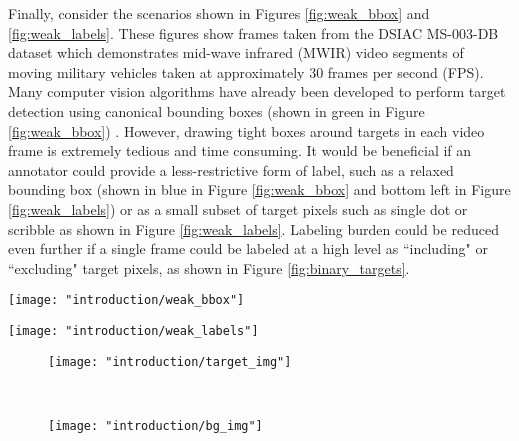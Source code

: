 Finally, consider the scenarios shown in Figures \ref{fig:weak_bbox} and \ref{fig:weak_labels}.  These figures show frames taken from the DSIAC MS-003-DB dataset \citep{DSIACATR} which demonstrates mid-wave infrared (MWIR) video segments of moving military vehicles taken at approximately 30 frames per second (FPS).  Many computer vision algorithms have already been developed to perform target detection using canonical bounding boxes (shown in green in Figure \ref{fig:weak_bbox}) \citep{Redmon2018YOLOV3}.  However, drawing tight boxes around targets in each video frame is extremely tedious and time consuming.  It would be beneficial if an annotator could provide a less-restrictive form of label, such as a relaxed bounding box (shown in blue in Figure \ref{fig:weak_bbox} and bottom left in Figure \ref{fig:weak_labels}) or as a small subset of target pixels such as single dot or scribble as shown in Figure \ref{fig:weak_labels}.  Labeling burden could be reduced even further if a single frame could be labeled at a high level as ``including" or ``excluding" target pixels, as shown in Figure \ref{fig:binary_targets}. 


\begin{center}
	\begin{figure*}[h]
		\centering
		\texttt{[image: "introduction/weak\_bbox"]}
		\caption[Example of bounding box imprecision.]{A sample frame from the DSIAC  MS-003-DB MWIR dataset.  Two targets are shown with canonical bounding boxes (green) and relaxed bounding boxes (blue).  Red dots represent the centers of the target objects.}
		\label{fig:weak_bbox}
	\end{figure*}
\end{center}

\begin{center}
	\begin{figure*}[h]
		\centering
		\texttt{[image: "introduction/weak\_labels"]}
		\caption[Forms of weak labels.]{Examples of weakly-labeled infrared imagery.  The images demonstrate various forms of weak groundtruth around a pickup truck taken with a mid-wave infrared camera.  The images show spot, scribble, imprecise bounding box and image-level labels, respectively.}
		\label{fig:weak_labels}
	\end{figure*}
\end{center}


\begin{figure*}[t!]
	\centering
	\begin{subfigure}[t]{0.5\textwidth}
		\centering
		\texttt{[image: "introduction/target\_img"]}
		\caption{}
	\end{subfigure}%
	~ 
	\begin{subfigure}[t]{0.5\textwidth}
		\centering
		\texttt{[image: "introduction/bg\_img"]}
		\caption{}
	\end{subfigure}
	\caption[Examples of image-level labels.]{Example of image-level labels for binary target detection.  Image (a) is denoted to contain pixels belonging to the target class somewhere within the image, while image (b) clearly contains samples solely from the background distribution.}
	\label{fig:binary_targets}%
\end{figure*}

